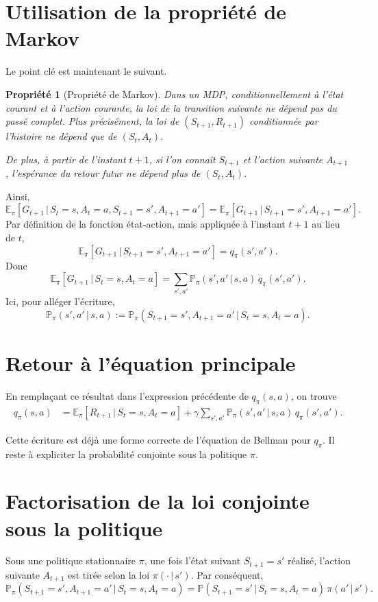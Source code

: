 \documentclass[11pt,a4paper]{article}
\newtheorem*{propriete}{Propriété}
\newcommand{\E}{\mathbb{E}}
\newcommand{\Pbb}{\mathbb{P}}
\newcommand{\given}{\,|\,}
\begin{document}
\section{Utilisation de la propriété de Markov}

Le point clé est maintenant le suivant.

\begin{propriete}[Propriété de Markov]
Dans un MDP, conditionnellement à l'état courant et à l'action courante, la loi de la transition suivante ne dépend pas du passé complet. Plus précisément, la loi de $(S_{t+1},R_{t+1})$ conditionnée par l'histoire ne dépend que de $(S_t,A_t)$.

De plus, à partir de l'instant $t+1$, si l'on connaît $S_{t+1}$ et l'action suivante $A_{t+1}$, l'espérance du retour futur ne dépend plus de $(S_t,A_t)$.
\end{propriete}

Ainsi,
\[
\E_{\pi}[G_{t+1} \given S_t=s, A_t=a, S_{t+1}=s', A_{t+1}=a']
=
\E_{\pi}[G_{t+1} \given S_{t+1}=s', A_{t+1}=a'].
\]
Par définition de la fonction état-action, mais appliquée à l'instant $t+1$ au lieu de $t$,
\[
\E_{\pi}[G_{t+1} \given S_{t+1}=s', A_{t+1}=a'] = q_{\pi}(s',a').
\]
Donc
\[
\E_{\pi}[G_{t+1} \given S_t=s, A_t=a]
= \sum_{s',a'} \Pbb_{\pi}(s',a' \given s,a)\, q_{\pi}(s',a').
\]
Ici, pour alléger l'écriture,
\[
\Pbb_{\pi}(s',a' \given s,a)
:= \Pbb_{\pi}(S_{t+1}=s', A_{t+1}=a' \given S_t=s, A_t=a).
\]

\section{Retour à l'équation principale}

En remplaçant ce résultat dans l'expression précédente de $q_{\pi}(s,a)$, on trouve
\begin{align*}
q_{\pi}(s,a)
&= \E_{\pi}[R_{t+1} \given S_t=s, A_t=a]
+ \gamma \sum_{s',a'} \Pbb_{\pi}(s',a' \given s,a)\, q_{\pi}(s',a').
\end{align*}

Cette écriture est déjà une forme correcte de l'équation de Bellman pour $q_{\pi}$. Il reste à expliciter la probabilité conjointe sous la politique $\pi$.

\section{Factorisation de la loi conjointe sous la politique}

Sous une politique stationnaire $\pi$, une fois l'état suivant $S_{t+1}=s'$ réalisé, l'action suivante $A_{t+1}$ est tirée selon la loi $\pi(\cdot \given s')$. Par conséquent,
\[
\Pbb_{\pi}(S_{t+1}=s', A_{t+1}=a' \given S_t=s, A_t=a)
=
\Pbb(S_{t+1}=s' \given S_t=s, A_t=a)\,\pi(a'\given s').
\]
\end{document}
